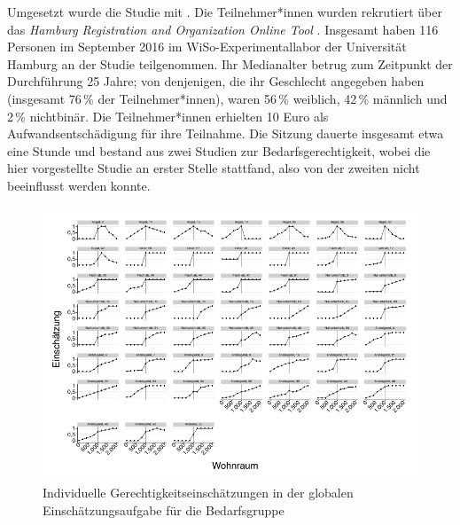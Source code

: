 \documentclass[justified,nobib,symmetric,twoside]{tufte-handout}
\begin{document}
Umgesetzt wurde die Studie mit \citet{limesurvey_limesurvey_2020}.
Die Teilnehmer*innen wurden rekrutiert über das \textit{Hamburg Registration and Organization Online Tool} \citep{bock_hroot_2014}.
Insgesamt haben 116 Personen im September 2016 im WiSo-Experimentallabor der Universität Hamburg an der Studie teilgenommen.
Ihr Medianalter betrug zum Zeitpunkt der Durchführung 25 Jahre; von denjenigen, die ihr Geschlecht angegeben haben (insgesamt 76\,\% der Teilnehmer*innen), waren 56\,\% weiblich, 42\,\% männlich und 2\,\% nichtbinär.
Die Teilnehmer*innen erhielten 10 Euro als Aufwandsentschädigung für ihre Teilnahme.
Die Sitzung dauerte insgesamt etwa eine Stunde und bestand aus zwei Studien zur Bedarfsgerechtigkeit, wobei die hier vorgestellte Studie an erster Stelle stattfand, also von der zweiten nicht beeinflusst werden konnte.

\begin{figure}[t]\label{fig:abbildung_3}
   \center
   \includegraphics[width=0.99\linewidth]{figure_3.pdf}
   \caption{Individuelle Gerechtigkeitseinschätzungen in der globalen Einschätzungsaufgabe für die Bedarfsgruppe}
\end{figure}
\end{document}
